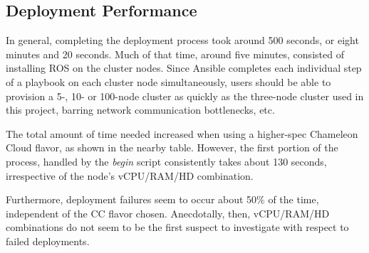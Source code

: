 \documentclass[9pt,twocolumn,twoside]{../../styles/osajnl}
\begin{document}
\subsection{Deployment Performance}
In general, completing the deployment process took around 500 seconds, or eight minutes and 20 seconds.  Much of that time, around five minutes, consisted of installing ROS on the cluster nodes.  Since Ansible completes each individual step of a playbook on each cluster node simultaneously, users should be able to provision a 5-, 10- or 100-node cluster as quickly as the three-node cluster used in this project, barring network communication bottlenecks, etc. 

The total amount of time needed increased when using a higher-spec Chameleon Cloud flavor, as shown in the nearby table.  However, the first portion of the process, handled by the \textit{begin} script consistently takes about 130 seconds, irrespective of the node's vCPU/RAM/HD combination.  

Furthermore, deployment failures seem to occur about 50\% of the time, independent of the CC flavor chosen.  Anecdotally, then, vCPU/RAM/HD combinations do not seem to be the first suspect to investigate with respect to failed deployments.

\end{document}
